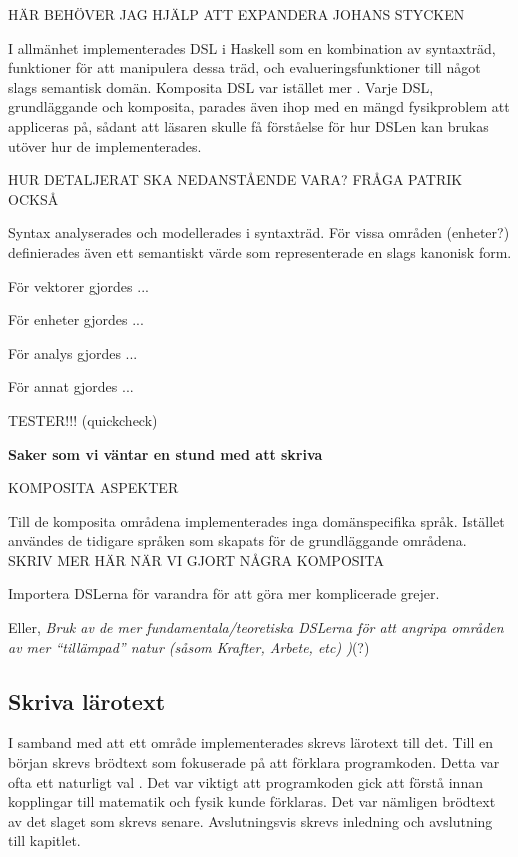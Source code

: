 \begin{binge}
HÄR BEHÖVER JAG HJÄLP ATT EXPANDERA JOHANS STYCKEN

I allmänhet implementerades DSL i Haskell som en kombination av syntaxträd,
funktioner för att manipulera dessa träd, och evalueringsfunktioner till något
slags semantisk domän. Komposita DSL var
istället mer . Varje DSL, grundläggande och komposita,
parades även ihop med en mängd fysikproblem att appliceras på, sådant att
läsaren skulle få förståelse för hur DSLen kan brukas utöver hur de
implementerades.

HUR DETALJERAT SKA NEDANSTÅENDE VARA? FRÅGA PATRIK OCKSÅ

Syntax analyserades och modellerades i syntaxträd. För vissa områden
(enheter?) definierades även ett semantiskt värde som representerade
en slags kanonisk form.

För vektorer gjordes ...

För enheter gjordes ...

För analys gjordes ...

För annat gjordes ...


TESTER!!! (quickcheck) 

\textbf{Saker som vi väntar en stund med att skriva}

KOMPOSITA ASPEKTER

Till de komposita områdena implementerades inga domänspecifika språk. Istället användes de tidigare språken som skapats för de grundläggande områdena. SKRIV MER HÄR NÄR VI GJORT NÅGRA KOMPOSITA

Importera DSLerna för varandra för att göra mer komplicerade grejer.

Eller, \emph{Bruk av de mer fundamentala/teoretiska DSLerna för att
  angripa områden av mer ``tillämpad'' natur (såsom Krafter, Arbete,
  etc) )}(?)

\subsection{Skriva lärotext}

I samband med att ett område implementerades skrevs lärotext till det. Till en
början skrevs brödtext som fokuserade på att förklara programkoden. Detta var
ofta ett naturligt val . Det var viktigt att
programkoden gick att förstå innan kopplingar till matematik och fysik kunde
förklaras. Det var nämligen brödtext av det slaget som skrevs senare.
Avslutningsvis skrevs inledning och avslutning till kapitlet.


\end{binge}
